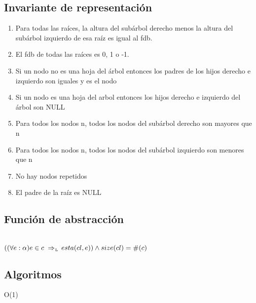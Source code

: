 \newpage
\subsection{Invariante de representación}

\begin{enumerate}
	\item Para todas las raíces, la altura del subárbol derecho menos la altura del subárbol izquierdo de esa raíz es igual al fdb.
	\item El fdb de todas las raíces es 0, 1 o -1.
	\item Si un nodo no es una hoja del árbol entonces los padres de los hijos derecho e izquierdo son iguales y es el nodo
	\item Si un nodo es una hoja del arbol entonces los hijos derecho e izquierdo del árbol son NULL
	\item Para todos los nodos n, todos los nodos del subárbol derecho son mayores que n
	\item Para todos los nodos n, todos los nodos del subárbol izquierdo son menores que n
	\item No hay nodos repetidos
	\item El padre de la raíz es NULL
\end{enumerate}

\subsection{Función de abstracción}

 \\
$((\paratodo{\alpha}{e}) e \in c \impluego esta(cl,e)) \land size(cl) = \#(c)$

\newpage
\subsection{Algoritmos}
{O(1)}


